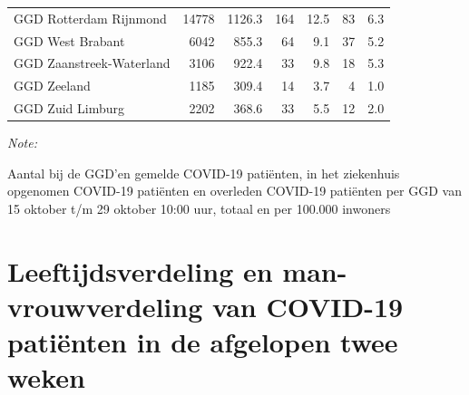 \documentclass[
  english,
  man,floatsintext]{apa6}
\begin{document}
\begin{table}[H]
\begin{threeparttable}
\begin{tabular}{lrrrrrr}
GGD Rotterdam Rijnmond & 14778 & 1126.3 & 164 & 12.5 & 83 & 6.3\\
GGD West Brabant & 6042 & 855.3 & 64 & 9.1 & 37 & 5.2\\
GGD Zaanstreek-Waterland & 3106 & 922.4 & 33 & 9.8 & 18 & 5.3\\
GGD Zeeland & 1185 & 309.4 & 14 & 3.7 & 4 & 1.0\\
GGD Zuid Limburg & 2202 & 368.6 & 33 & 5.5 & 12 & 2.0\\
\bottomrule
\end{tabular}
\begin{tablenotes}
\item \textit{Note: } 
\item Aantal bij de GGD’en gemelde COVID-19 patiënten, in het ziekenhuis opgenomen COVID-19 patiënten en overleden COVID-19 patiënten per GGD van 15 oktober t/m 29 oktober 10:00 uur, totaal en per 100.000 inwoners
\end{tablenotes}
\end{threeparttable}
\endgroup{}
\end{table}

\newpage

\hypertarget{leeftijdsverdeling-en-man-vrouwverdeling-van-covid-19-patiuxebnten-in-de-afgelopen-twee-weken}{%
\section{Leeftijdsverdeling en man-vrouwverdeling van COVID-19 patiënten in de afgelopen twee weken}\label{leeftijdsverdeling-en-man-vrouwverdeling-van-covid-19-patiuxebnten-in-de-afgelopen-twee-weken}}
\end{document}
